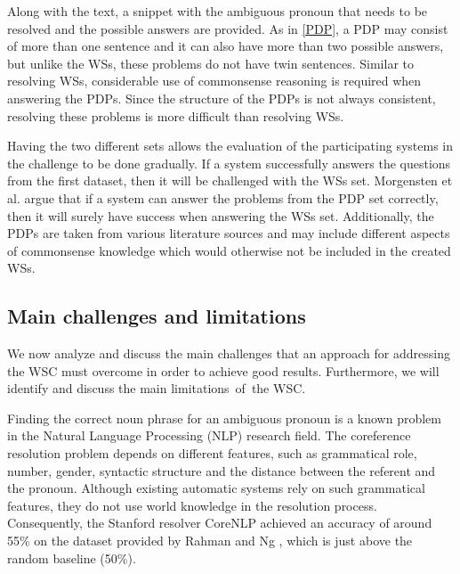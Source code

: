 Along with the text, a snippet with the ambiguous pronoun that needs to be resolved and the possible answers are provided. As in \ref{PDP}, a PDP may consist of more than one sentence and it can also have more than two possible answers, but unlike the WSs, these problems do not have twin sentences. Similar to resolving WSs, considerable use of commonsense reasoning is required when answering the PDPs. Since the structure of the PDPs is not always consistent, resolving these problems is more difficult than resolving WSs.

Having the two different sets allows the evaluation of the participating systems in the challenge to be done gradually. 
If a system successfully answers the questions from the first dataset, then it will be challenged with the WSs set. Morgensten et al. \cite{DBLP:journals/aim/MorgensternDO16} argue that if a system can answer the problems from the PDP set correctly, then it will surely have success when answering the WSs set.  
Additionally, the PDPs are taken from various literature sources and may include different aspects of commonsense knowledge which would otherwise not be included in the created WSs. 

\begin{comment}
Since the idea of the authors of the WSC was to construct this challenge as an alternative to the Turing test, it can be observed that indeed it captures the main characteristics of a Turing test: 

\begin{itemize}
	\item it requires the subject to respond on a non-domain specific set of English sentences
	\item it is easy to solve by native English speakers
	\item to pass successfully the test, the subject has to think
\end{itemize}
\end{comment}


\subsection{Main challenges and limitations}
We now analyze and discuss the main challenges that an approach for addressing the WSC must overcome in order to achieve good results. Furthermore, we will identify and discuss the main limitations~of~the WSC. 

Finding the correct noun phrase for an ambiguous pronoun is a known problem in the Natural Language Processing (NLP) research field. The coreference resolution problem depends on different features, such as grammatical role, number, gender, syntactic structure and the distance between the referent and the pronoun. Although existing automatic systems rely on such grammatical features, they do not use world knowledge in the resolution process. Consequently, the Stanford resolver CoreNLP \cite{lee11conllst} achieved an accuracy of around 55\% on the dataset provided by Rahman and Ng \cite{DBLP:conf/emnlp/RahmanN12}, which is just above the random baseline (50\%).
	

